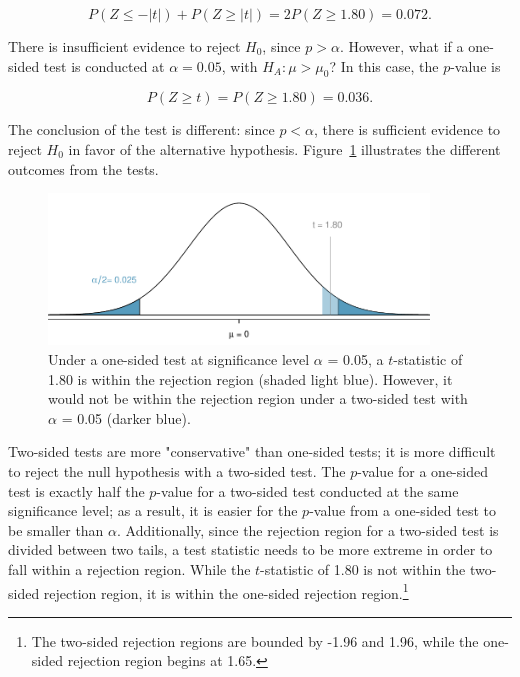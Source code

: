 \[P(Z \leq -|t|) + P(Z \geq |t|)= 2P(Z \geq 1.80) = 0.072.\]

There is insufficient evidence to reject $H_0$, since $p > \alpha$. However, what if a one-sided test is conducted at $\alpha = 0.05$, with $H_A: \mu > \mu_0$? In this case, the $p$-value is

\[P(Z \geq t)= P(Z \geq 1.80) = 0.036.\]

The conclusion of the test is different: since $p < \alpha$, there is sufficient evidence to reject $H_0$ in favor of the alternative hypothesis. Figure~\ref{twoSidedTestConservative} illustrates the different outcomes from the tests.

\begin{figure}[h]
	\centering
	\includegraphics[width=0.9\textwidth]
	{ch_05a_inference_foundations_oi_biostat/figures/twoSidedTestConservative/twoSidedTestConservative}
	\caption{Under a one-sided test at significance level $\alpha$ = 0.05, a $t$-statistic of 1.80 is within the rejection region (shaded light blue). However, it would not be within the rejection region under a two-sided test with $\alpha$ = 0.05 (darker blue).}
	\label{twoSidedTestConservative}
\end{figure}

Two-sided tests are more "conservative" than one-sided tests; it is more difficult to reject the null hypothesis with a two-sided test. The $p$-value for a one-sided test is exactly half the $p$-value for a two-sided test conducted at the same significance level; as a result, it is easier for the $p$-value from a one-sided test to be smaller than $\alpha$. Additionally, since the rejection region for a two-sided test is divided between two tails, a test statistic needs to be more extreme in order to fall within a rejection region. While the $t$-statistic of 1.80 is not within the two-sided rejection region, it is within the one-sided rejection region.\footnote{The two-sided rejection regions are bounded by -1.96 and 1.96, while the one-sided rejection region begins at 1.65.}

